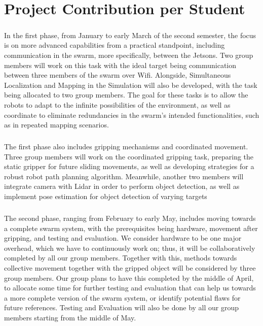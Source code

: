 \chapter{Project Contribution per Student}

\paragraph*{}
In the first phase, from January to early March of the second semester, the focus is on more advanced capabilities from a practical standpoint, including communication in the swarm, more specifically, between the Jetsons. Two group members will work on this task with the ideal target being communication between three members of the swarm over Wifi. Alongside, Simultaneous Localization and Mapping in the Simulation will also be developed, with the task being allocated to two group members. The goal for these tasks is to allow the robots to adapt to the infinite possibilities of the environment, as well as coordinate to eliminate redundancies in the swarm's intended functionalities, such as in repeated mapping scenarios.

\paragraph*{}
The first phase also includes gripping mechanisms and coordinated movement. Three group members will work on the coordinated gripping task, preparing the static gripper for future sliding movements, as well as developing strategies for a robust robot path planning algorithm. Meanwhile, another two members will integrate camera with Lidar in order to perform object detection, as well as implement pose estimation for object detection of varying targets

\paragraph*{}
The second phase, ranging from February to early May, includes moving towards a complete swarm system, with the prerequisites being hardware, movement after gripping, and testing and evaluation. We consider hardware to be one major overhead, which we have to continuously work on; thus, it will be collaboratively completed by all our group members. Together with this, methods towards collective movement together with the gripped object will be considered by three group members. Our group plans to have this completed by the middle of April, to allocate some time for further testing and evaluation that can help us towards a more complete version of the swarm system, or identify potential flaws for future references. Testing and Evaluation will also be done by all our group members starting from the middle of May.
